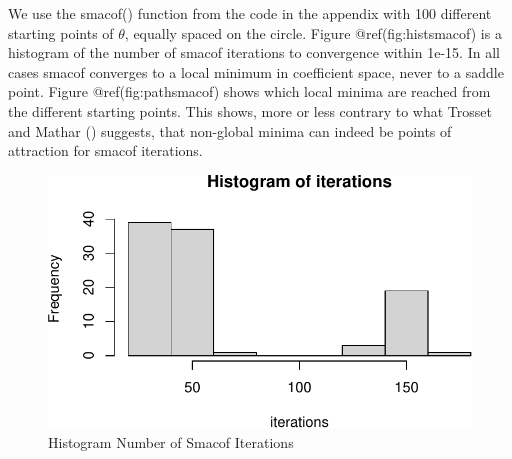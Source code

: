 \documentclass[
  12pt,
  letterpaper,
  DIV=11,
  numbers=noendperiod]{scrreprt}
\theoremstyle{remark}
\begin{document}
We use the smacof() function from the code in the appendix with 100
different starting points of \(\theta\), equally spaced on the circle.
Figure @ref(fig:histsmacof) is a histogram of the number of smacof
iterations to convergence within 1e-15. In all cases smacof converges to
a local minimum in coefficient space, never to a saddle point. Figure
@ref(fig:pathsmacof) shows which local minima are reached from the
different starting points. This shows, more or less contrary to what
Trosset and Mathar () suggests,
that non-global minima can indeed be points of attraction for smacof
iterations.

\begin{figure}[H]

{\centering \includegraphics{minimization_files/figure-pdf/histsmacof-1.pdf}

}

\caption{Histogram Number of Smacof Iterations}

\end{figure}%
\end{document}
